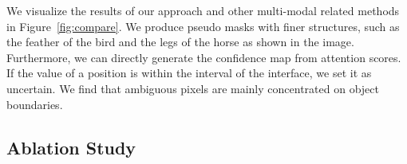 \documentclass[letterpaper]{article} \usepackage[submission]{aaai24}  \usepackage{times}  \usepackage{helvet}  \usepackage{courier}  \usepackage[hyphens]{url}  \usepackage{graphicx} \urlstyle{rm} \def\UrlFont{\rm}  \usepackage{natbib}  \usepackage{caption} \frenchspacing  \setlength{\pdfpagewidth}{8.5in} \setlength{\pdfpageheight}{11in} \usepackage{algorithm}
\begin{document}
We visualize the results of our approach and other multi-modal related methods~\cite{clims, CLIP-ES} in Figure~\ref{fig:compare}.
We produce pseudo masks with finer structures, such as the feather of the bird and the legs of the horse as shown in the image.
Furthermore, we can directly generate the confidence map from attention scores.
If the value of a position is within the  interval of the interface, we set it as uncertain.
We find that ambiguous pixels are mainly concentrated on object boundaries.


\subsection{Ablation Study}
\label{sec:ablation}
\end{document}
